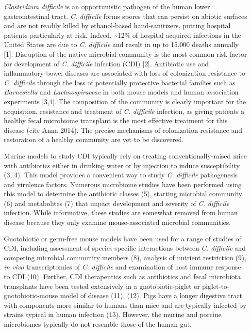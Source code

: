 \documentclass[11pt,]{article}
\begin{document}
\emph{Clostridium difficile} is an opportunistic pathogen of the human
lower gastrointestinal tract. \emph{C. difficile} forms spores that can
persist on abiotic surfaces and are not readily killed by ethanol-based
hand-sanitizers, putting hospital patients particularly at risk. Indeed,
\textasciitilde{}12\% of hospital acquired infections in the United
States are due to \emph{C. difficile} and result in up to 15,000 deaths
annually {[}1{]}. Disruption of the native microbial community is the
most common risk factor for development of \emph{C. difficile} infection
(CDI) {[}2{]}. Antibiotic use and inflammatory bowel diseases are
associated with loss of colonization resistance to \emph{C. difficile}
through the loss of potentially protective bacterial families such as
\emph{Barnesiella} and \emph{Lachnospiraceae} in both mouse models and
human association experiments {[}3,4{]}. The composition of the
community is clearly important for the acquisition, resistance and
treatment of \emph{C. difficile} infection, as giving patients a healthy
fecal microbiome transplant is the most effective treatment for this
disease (cite Anna 2014). The precise mechanisms of colonization
resistance and restoration of a healthy community are yet to be
discovered.

Murine models to study CDI typically rely on treating
conventionally-raised mice with antibiotics either in drinking water or
by injection to induce susceptibility (3, 4). This model provides a
convenient way to study \emph{C. difficile} pathogenesis and virulence
factors. Numerous microbiome studies have been performed using this
model to determine the antibiotic classes (5), starting microbial
community (6) and metabolites (7) that impact development and severity
of \emph{C. difficile} infection. While informative, these studies are
somewhat removed from human disease because they only examine
mouse-associated microbial communities.

Gnotobiotic or germ-free mouse models have been used for a range of
studies of CDI, including assessment of species-specific interactions
between \emph{C. difficile} and competing microbial community members
(8), analysis of nutrient restriction (9), \emph{in vivo}
transcriptomics of \emph{C. difficile} and examination of host immune
response to CDI (10). Further, CDI therapeutics such as antibiotics and
fecal microbiota transplants have been tested extensively in a
gnotobiotic-piglet or piglet-to-gnotobiotic-mouse model of disease (11),
(12). Pigs have a longer digestive tract with components more similar to
humans than mice and are typically infected by strains typical in human
infection (13). However, the murine and porcine microbiomes typically do
not resemble those of the human gut.
\end{document}
